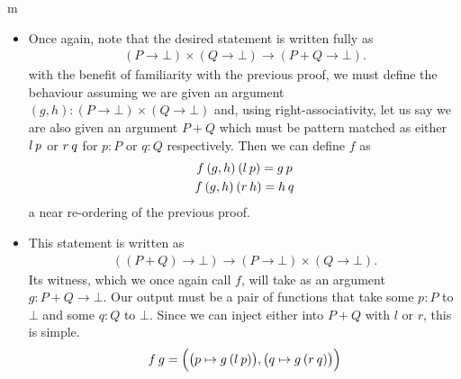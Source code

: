 \documentclass[11pt]{article}
\begin{document}
\begin{my proof}{m}
\begin{itemize}
\item Once again, note that the desired statement is written fully as \begin{gather*}
(P \to \bot) \times (Q \to \bot) \to (P + Q \to \bot).
\end{gather*}
with the benefit of familiarity with the previous proof, we must define the behaviour assuming we are given an argument $(g,h) \colon (P \to \bot) \times (Q \to \bot)$ and, using right-associativity, let us say we are also given an argument $P + Q$ which must be pattern matched as either $l \hspace{0.2em} p$ or $r \hspace{0.2em} q$ for $p \colon P$ or $q \colon Q$ respectively. Then we can define $f$ as \begin{gather*}
f \hspace{0.2em} (g,h) \hspace{0.2em} (l \hspace{0.2em} p) = g \hspace{0.2em} p \\
f \hspace{0.2em} (g,h) \hspace{0.2em} (r \hspace{0.2em} h) = h \hspace{0.2em} q
\end{gather*}
a near re-ordering of the previous proof.

\item This statement is written as \begin{gather*}
((P + Q) \to \bot) \to (P \to \bot) \times (Q \to \bot).
\end{gather*}
Its witness, which we once again call $f$, will take as an argument $g \colon P + Q \to \bot$. Our output must be a pair of functions that take some $p\colon P$ to $\bot$ and some $q \colon Q$ to $\bot$. Since we can inject either into $P+Q$ with $l$ or $r$, this is simple. \begin{gather*}
f \hspace{0.2em} g = \Big( \big( p \mapsto g \hspace{0.2em} (l \hspace{0.2em} p) \big), \big(q \mapsto g \hspace{0.2em} (r \hspace{0.2em} q) \big)\Big)
\end{gather*}


\end{itemize}
\end{my proof}
\end{document}
